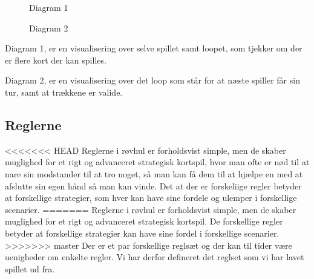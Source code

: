 \documentclass[a4paper, 12pt]{article}
\begin{document}
\begin{figure}[H]
	\centering
	
	\caption{Diagram 1}
\end{figure}

\begin{figure}[H]
	\centering
	
	\caption{Diagram 2}
\end{figure}

Diagram 1, er en visualisering over selve spillet samt loopet, som tjekker om der er flere kort der kan spilles.
\bigbreak

Diagram 2, er en visualisering over det loop som står for at næste spiller får sin tur, samt at trækkene er valide.

\vfill
\pagebreak


\subsection{Reglerne}
<<<<<<< HEAD
Reglerne i røvhul er forholdsvist simple, men de skaber muglighed for et rigt og advanceret strategisk kortspil, hvor man ofte er nød til at nare sin modstander til at tro noget, så man kan få dem til at hjælpe en med at afslutte sin egen hånd så man kan vinde.
Det at der er forskeliige regler betyder at forskellige strategier, som hver kan have sine fordele og ulemper i forskellige scenarier. 
=======
Reglerne i røvhul er forholdsvist simple, men de skaber muglighed for et rigt og advanceret strategisk kortspil.
De forskellige regler betyder at forskellige strategier kan have sine fordel i forskellige scenarier. 
>>>>>>> master
Der er et par forskellige reglsæt og der kan til tider være uenigheder om enkelte regler. Vi har derfor defineret det reglset som vi har lavet spillet ud fra.
\end{document}

